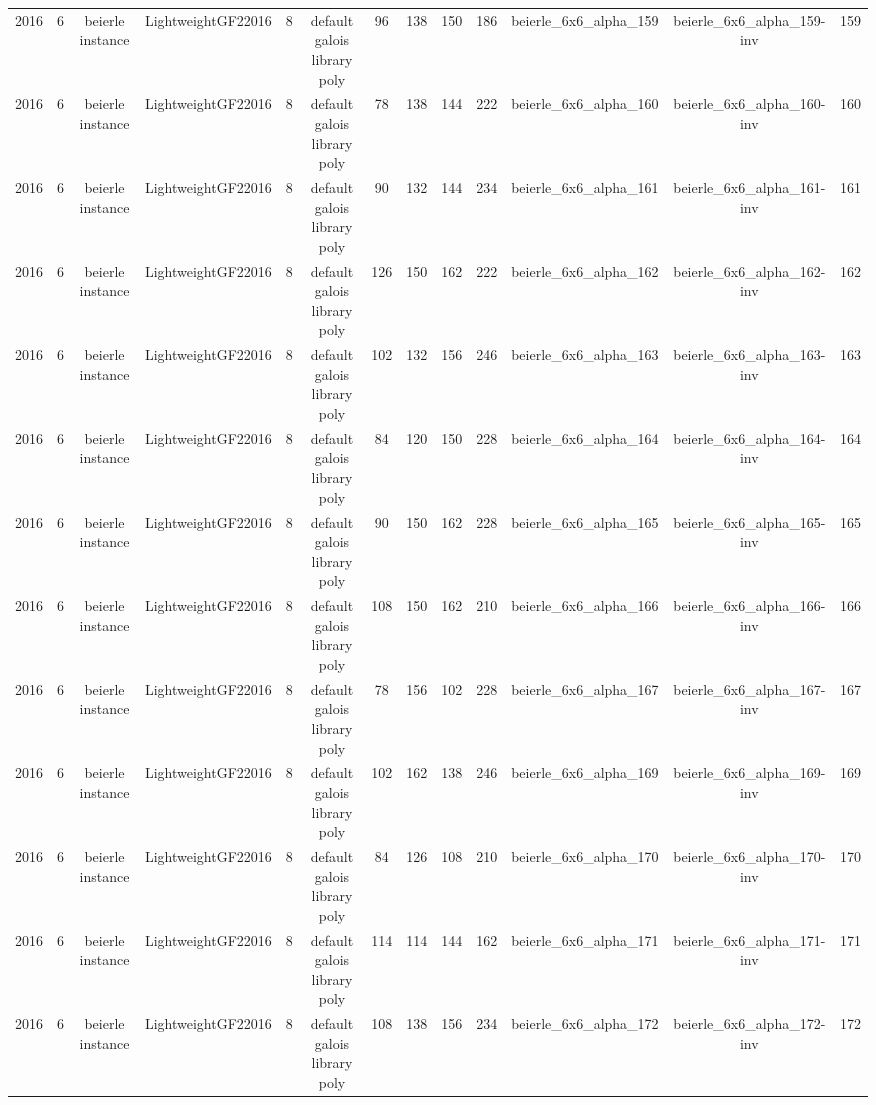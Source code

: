 \begin{tabular}{c c c c c c c c c c c c c}
2016 & 6 & beierle instance & LightweightGF22016 & 8 & default galois library poly & 96 & 138 & 150 & 186 & beierle_6x6_alpha_159 & beierle_6x6_alpha_159-inv & 159 \\
2016 & 6 & beierle instance & LightweightGF22016 & 8 & default galois library poly & 78 & 138 & 144 & 222 & beierle_6x6_alpha_160 & beierle_6x6_alpha_160-inv & 160 \\
2016 & 6 & beierle instance & LightweightGF22016 & 8 & default galois library poly & 90 & 132 & 144 & 234 & beierle_6x6_alpha_161 & beierle_6x6_alpha_161-inv & 161 \\
2016 & 6 & beierle instance & LightweightGF22016 & 8 & default galois library poly & 126 & 150 & 162 & 222 & beierle_6x6_alpha_162 & beierle_6x6_alpha_162-inv & 162 \\
2016 & 6 & beierle instance & LightweightGF22016 & 8 & default galois library poly & 102 & 132 & 156 & 246 & beierle_6x6_alpha_163 & beierle_6x6_alpha_163-inv & 163 \\
2016 & 6 & beierle instance & LightweightGF22016 & 8 & default galois library poly & 84 & 120 & 150 & 228 & beierle_6x6_alpha_164 & beierle_6x6_alpha_164-inv & 164 \\
2016 & 6 & beierle instance & LightweightGF22016 & 8 & default galois library poly & 90 & 150 & 162 & 228 & beierle_6x6_alpha_165 & beierle_6x6_alpha_165-inv & 165 \\
2016 & 6 & beierle instance & LightweightGF22016 & 8 & default galois library poly & 108 & 150 & 162 & 210 & beierle_6x6_alpha_166 & beierle_6x6_alpha_166-inv & 166 \\
2016 & 6 & beierle instance & LightweightGF22016 & 8 & default galois library poly & 78 & 156 & 102 & 228 & beierle_6x6_alpha_167 & beierle_6x6_alpha_167-inv & 167 \\
2016 & 6 & beierle instance & LightweightGF22016 & 8 & default galois library poly & 102 & 162 & 138 & 246 & beierle_6x6_alpha_169 & beierle_6x6_alpha_169-inv & 169 \\
2016 & 6 & beierle instance & LightweightGF22016 & 8 & default galois library poly & 84 & 126 & 108 & 210 & beierle_6x6_alpha_170 & beierle_6x6_alpha_170-inv & 170 \\
2016 & 6 & beierle instance & LightweightGF22016 & 8 & default galois library poly & 114 & 114 & 144 & 162 & beierle_6x6_alpha_171 & beierle_6x6_alpha_171-inv & 171 \\
2016 & 6 & beierle instance & LightweightGF22016 & 8 & default galois library poly & 108 & 138 & 156 & 234 & beierle_6x6_alpha_172 & beierle_6x6_alpha_172-inv & 172 \\

\end{tabular}
